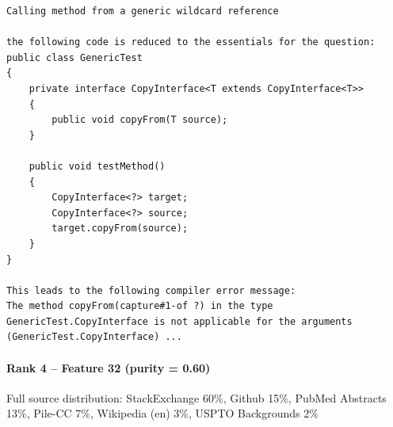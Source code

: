 \begin{verbatim}
Calling method from a generic wildcard reference

the following code is reduced to the essentials for the question:
public class GenericTest 
{
    private interface CopyInterface<T extends CopyInterface<T>>
    {
        public void copyFrom(T source);
    }

    public void testMethod()
    {
        CopyInterface<?> target;
        CopyInterface<?> source;
        target.copyFrom(source);
    }
}

This leads to the following compiler error message:
The method copyFrom(capture#1-of ?) in the type GenericTest.CopyInterface is not applicable for the arguments (GenericTest.CopyInterface) ...

\end{verbatim}

\paragraph*{Rank 4 -- Feature 32 (purity = 0.60)}

Full source distribution: StackExchange 60\%, Github 15\%, PubMed Abstracts 13\%, Pile-CC 7\%, Wikipedia (en) 3\%, USPTO Backgrounds 2\%

